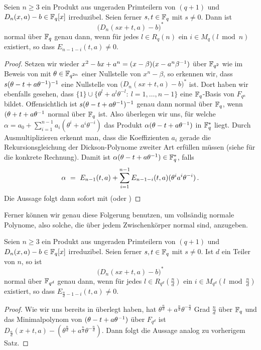 \begin{satz}
  \label{satz:scheerhorn3}
  Seien $n\geq 3$ ein Produkt aus ungeraden Primteilern von $(q+1)$ und
  $D_n(x,a)-b \in \mathbb{F}_q[x]$ irreduzibel. Seien ferner $s,t\in \mathbb{F}_q$ mit
  $s\neq 0$. Dann ist
  \[ \big(D_n(sx+t,a)-b\big)^\ast\]
  normal über $\mathbb{F}_q$ genau dann, wenn für jedes $l\in R_q(n)$ ein
  $i\in M_q(l\bmod n)$ existiert, so dass $E_{n-1-i}(t,a)\neq 0$.
\end{satz}
\begin{proof}
  Setzen wir wieder $x^2-bx+a^n = (x-\beta)(x-a^n\beta^{-1})$ über $\mathbb{F}_{q^2}$
  wie im Beweis von  mit $\theta \in \mathbb{F}_{q^{2n}}$ einer
  Nullstelle von $x^n-\beta$, so erkennen wir, dass
  $s(\theta-t+a\theta^{-1})^{-1}$ eine Nullstelle von 
  $\big(D_n(sx+t,a)-b\big)^\ast$ ist.
  Dort haben wir ebenfalls gesehen, dass
  $\{ 1\} \cup \{\theta^l+a^l\theta^{-l}:\ l=1,\ldots,n-1\}$ eine 
  $\mathbb{F}_q$-Basis von $F_{q^n}$ bildet. Offensichtlich ist
  $s(\theta-t+a\theta^{-1})^{-1}$ genau dann normal über $\mathbb{F}_q$, wenn
  $(\theta+t+a\theta^{-1}$ normal über $\mathbb{F}_q$ ist. Also überlegen wir uns,
  für welche $\alpha = a_0 + \sum_{i=1}^{n-1} a_i(\theta^i+a^i\theta^{-i})$
  das Produkt $\alpha(\theta-t+a\theta^{-1})$ in $\mathbb{F}_q^\ast$ liegt.
  Durch Ausmultiplizieren erkennt man, dass die Koeffizienten $a_i$ gerade 
  die Rekursionsgleichung der Dickson-Polynome zweiter Art erfüllen müssen 
  (siehe \autocite[Beweis zu Theorem 4]{scheerhorn:1997} für die konkrete
  Rechnung). Damit ist $\alpha(\theta-t+a\theta^{-1}) \in \mathbb{F}_q^\ast$, falls
  \[ \alpha \ =\  E_{n-1}(t,a) + \sum_{i=1}^{n-1} E_{n-1-i}(t,a)
    (\theta^ia^i\theta^{-i})\,.\]
  Die Aussage folgt dann sofort mit  
  (oder )
\end{proof}


Ferner können wir genau diese Folgerung benutzen, um vollsändig normale
Polynome, also solche, die über jedem Zwischenkörper normal sind, anzugeben.

\begin{satz}
  \label{satz:scheerhorn4}
  Seien $n\geq 3$ ein Produkt aus ungeraden Primteilern von $(q+1)$ und
  $D_n(x,a)-b \in \mathbb{F}_q[x]$ irreduzibel. Seien ferner $s,t\in \mathbb{F}_q$ mit
  $s\neq 0$. Ist $d$ ein Teiler von $n$, so ist
  \[ \big(D_n(sx+t,a)-b\big)^\ast\]
  normal über $\mathbb{F}_{q^d}$ genau dann, wenn für jedes 
  $l\in R_{q^d}(\tfrac n d)$ ein
  $i\in M_{q^d}(l\bmod \tfrac n d)$ existiert, so dass 
  $E_{\frac n d -1-i}(t,a)\neq 0$.
\end{satz}
\begin{proof}
  Wie wir uns bereits in  überlegt haben, hat
  $\theta^{\frac n d}+a^{\frac n d} \theta^{-\frac n d}$ Grad $\tfrac n d$ über 
  $\mathbb{F}_q$ und das Minimalpolynom von 
  $(\theta -t+a\theta^{-1})$ über $F_{q^d}$ ist 
  $D_{\frac n d}(x+t,a) - (\theta^{\frac n d}+a^{\frac n d}\theta^{-\frac n
  d})$. Dann folgt die Aussage analog zu vorherigem Satz.
\end{proof}


